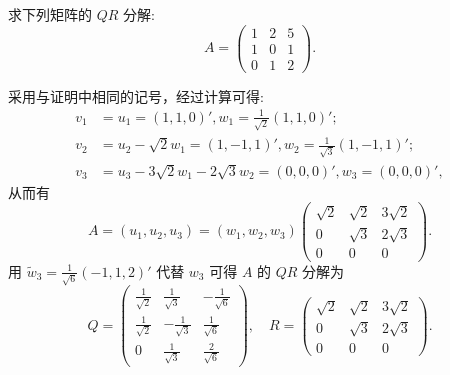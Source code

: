 \documentclass[../../main.tex]{subfiles}
\begin{document}
\begin{example}
求下列矩阵的 $QR$ 分解:
\[
A = \begin{pmatrix}
1 & 2 & 5 \\
1 & 0 & 1 \\
0 & 1 & 2
\end{pmatrix}.
\]
\end{example}
\begin{solution}
采用与证明中相同的记号，经过计算可得:
\begin{align*}
v_1&=u_1=(1,1,0)' ,w_1=\frac{1}{\sqrt{2}}(1,1,0)' ;
\\
v_2&=u_2-\sqrt{2}w_1=(1,-1,1)' ,w_2=\frac{1}{\sqrt{3}}(1,-1,1)' ;
\\
v_3&=u_3-3\sqrt{2}w_1-2\sqrt{3}w_2=(0,0,0)' ,w_3=(0,0,0)',
\end{align*}
从而有
\[
A = (u_1,u_2,u_3) = (w_1,w_2,w_3)\begin{pmatrix}
\sqrt{2} & \sqrt{2} & 3\sqrt{2} \\
0 & \sqrt{3} & 2\sqrt{3} \\
0 & 0 & 0
\end{pmatrix}.
\]
用 $\widetilde{w}_3 = \frac{1}{\sqrt{6}}(-1,1,2)'$ 代替 $w_3$ 可得 $A$ 的 $QR$ 分解为
\[
Q = \begin{pmatrix}
\frac{1}{\sqrt{2}} & \frac{1}{\sqrt{3}} & -\frac{1}{\sqrt{6}} \\
\frac{1}{\sqrt{2}} & -\frac{1}{\sqrt{3}} & \frac{1}{\sqrt{6}} \\
0 & \frac{1}{\sqrt{3}} & \frac{2}{\sqrt{6}}
\end{pmatrix}, \quad
R = \begin{pmatrix}
\sqrt{2} & \sqrt{2} & 3\sqrt{2} \\
0 & \sqrt{3} & 2\sqrt{3} \\
0 & 0 & 0
\end{pmatrix}.
\] 
\end{solution}
\end{document}
